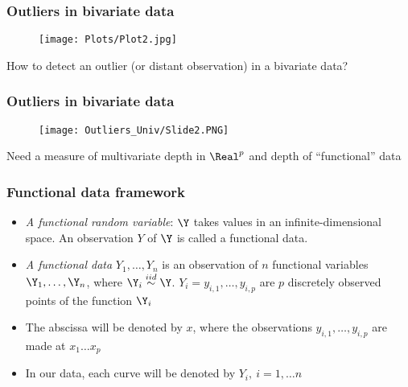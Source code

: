 \documentclass[10pt,dvipsnames,table]{beamer}
\begin{document}
\begin{frame}
\frametitle{Outliers in bivariate data}
\vspace{-0.5cm}
\begin{figure}[t]
\centering
\texttt{[image: Plots/Plot2.jpg]}
\end{figure}
\vspace{-0.5cm}
How to detect an outlier (or distant observation) in a bivariate data?
\end{frame}

\begin{frame}
\frametitle{Outliers in bivariate data}
\vspace{-0.5cm}
\begin{figure}[t]
\centering
\texttt{[image: Outliers\_Univ/Slide2.PNG]}
\end{figure}
\vspace{-0.5cm}
Need a measure of multivariate depth in $\Real ^ p$ and depth of ``functional'' data
\end{frame}

\begin{frame}
\frametitle{Functional data framework}
\begin{itemize}
\item {\emph{A functional random variable}}: $\Y$ takes values in an infinite-dimensional space. An observation $Y$ of $\Y$ is called a functional data.
\item {\emph{A functional data}} $Y_1, \dots, Y_n$ is an observation of $n$ functional variables $\Y_1, \dots, \Y_n$, where $\Y_i \stackrel{iid}{\sim} \Y$. $Y_i = {y_{i,1}, \dots, y_{i,p}}$ are $p$ discretely observed points of the function $\Y_i$
\item The abscissa will be denoted by $x$, where the observations $y_{i,1}, \dots, y_{i,p}$ are made at $x_1 \dots x_p$
\item In our data, each curve will be denoted by $Y_i, \ i = 1, \dots n$
\end{itemize}
\end{frame}
\end{document}
